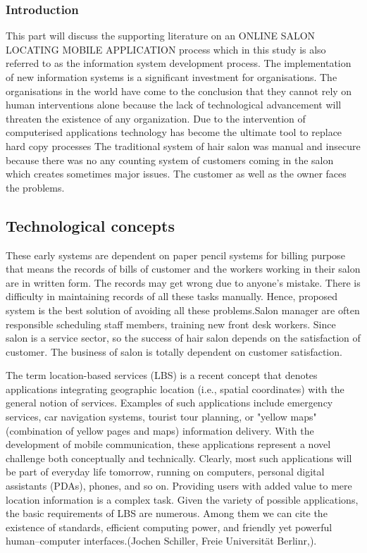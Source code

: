 \documentclass[11pt]{article}
\begin{document}
\subsubsection{Introduction}
 This part will discuss the supporting literature on an ONLINE SALON LOCATING MOBILE APPLICATION process which in this study is also referred to as the information system development process. The implementation of new information systems is a significant investment for organisations. The organisations in the world have come to the conclusion that they cannot rely on human interventions alone because the lack of technological advancement will threaten the existence of any organization. Due to the intervention of computerised applications technology has become the ultimate tool to replace hard copy processes
The traditional system of hair salon was manual and insecure because there was no any counting system of\cite{kuh1993their}
customers coming in the salon which creates sometimes major issues. The customer as well as the owner  faces the problems.

\subsection*{Technological concepts}
These early systems are dependent on paper pencil systems for billing purpose that means the records
of bills of customer and the workers working in their salon are in written form. The records may get wrong due to anyone's mistake. There is difficulty in maintaining records of all these tasks manually. Hence, proposed system is the best solution of avoiding all these problems.Salon manager are often responsible scheduling staff members, training new front desk workers.
Since salon is a service sector, so the success of hair salon depends on the satisfaction of customer. The business of salon is totally dependent on customer satisfaction.

The term location-based services (LBS) is a recent concept that denotes applications integrating geographic location (i.e., spatial coordinates) with the general notion of services. Examples of such applications include emergency services, car navigation systems, tourist tour planning, or "yellow maps" (combination of yellow pages and maps) information delivery.
With the development of mobile communication, these applications represent a novel challenge both conceptually and technically. Clearly, most such applications will be part of everyday life tomorrow, running on computers, personal digital assistants (PDAs), phones, and so on. Providing users with added value to mere location information is a complex task. Given the variety of possible applications, the basic requirements of LBS are numerous. Among them we can cite the existence of standards, efficient computing power, and friendly yet powerful human–computer interfaces.(Jochen Schiller, Freie Universität Berlinr,).
\end{document}
